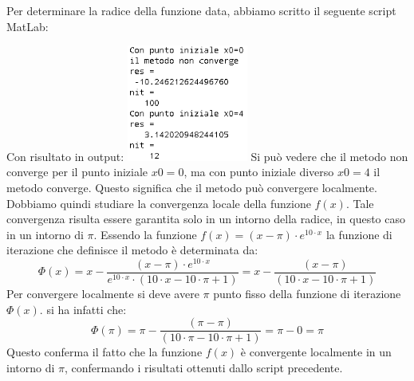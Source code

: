 \begin{flushleft}
Per determinare la radice della funzione data, abbiamo scritto il seguente script MatLab:

Con risultato in output:
\newline
\includegraphics[width=150px]{cap_2/es8/es28.png}
\newline
Si può vedere che il metodo non converge per il punto iniziale $x0=0$, ma con punto iniziale diverso $x0=4$ il metodo converge. Questo significa che il metodo può convergere localmente. Dobbiamo quindi studiare la convergenza locale della funzione $f(x)$. Tale convergenza risulta essere garantita solo in un intorno della radice, in questo caso in un intorno di $\pi$. Essendo la funzione $f(x) = (x-\pi)\cdot e^{10\cdot x}$ la funzione di iterazione che definisce il metodo è determinata da:
\[
\Phi(x) = x-\frac{(x-\pi)\cdot e^{10\cdot x}}{e^{10\cdot x}\cdot (10\cdot x - 10 \cdot \pi + 1)} = x - \frac{(x-\pi)}{(10\cdot x - 10 \cdot \pi + 1)}
\]
Per convergere localmente si deve avere $\pi$ punto fisso della funzione di iterazione $\Phi(x)$. si ha infatti che:
\[
\Phi(\pi) = \pi - \frac{(\pi-\pi)}{(10\cdot \pi - 10 \cdot \pi + 1)} = \pi - 0 = \pi
\]
Questo conferma il fatto che la funzione $f(x)$ è convergente localmente in un intorno di $\pi$, confermando i risultati ottenuti dallo script precedente.
\end{flushleft}